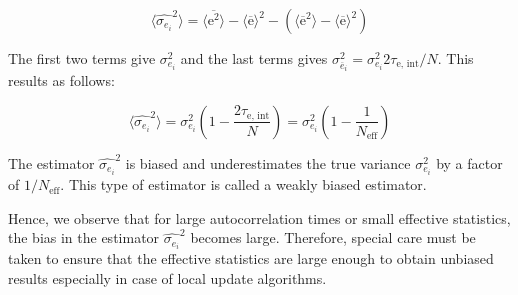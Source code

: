 \begin{equation}
  \langle \hat{\sigma_{e_i}}^2 \rangle = \langle \overline{\text{e}^2} \rangle - \langle \overline{\text{e}} \rangle^2 - (\langle \overline{\text{e}} ^2\rangle - \langle \overline{\text{e}} \rangle^2 )
\end{equation}

The first two terms give $\sigma_{e_i}^2$ and the last terms gives
$\sigma_{\overline{e}_i}^2 = \sigma_{e_i}^2 2\tau_{\text{e, int}}/N$. This
results as follows:

\begin{equation}
  \langle \hat{\sigma_{e_i}}^2 \rangle = \sigma_{e_i}^2 \left(1 - \frac{2\tau_{\text{e, int}}}{N}\right) = \sigma_{e_i}^2 \left(1 - \frac{1}{N_{\text{eff}}}\right)
\end{equation}

The estimator $\hat{\sigma_{e_i}}^2$ is biased and underestimates the true
variance $\sigma_{e_i}^2$ by a factor of $1/N_{\text{eff}}$. This type of
estimator is called a weakly biased estimator.

Hence, we observe that for large autocorrelation times or small effective
statistics, the bias in the estimator $\hat{\sigma_{e_i}}^2$ becomes large.
Therefore, special care must be taken to ensure that the effective statistics
are large enough to obtain unbiased results especially in case of local update
algorithms.

